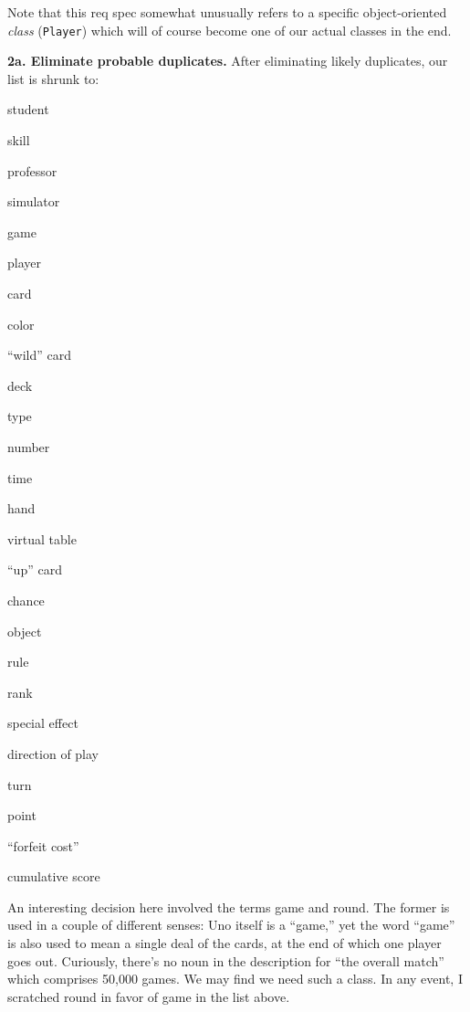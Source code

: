 Note that this req spec somewhat unusually refers to a specific
object-oriented \textit{class} (\texttt{Player}) which will of course become
one of our actual classes in the end.

\vspace{.1in}
\textbf{2a. Eliminate probable duplicates.} After eliminating likely
duplicates, our list is shrunk to:

\begin{samepage}
\begin{multicols}{3}
\small
\begin{compactitem}
\renewcommand\labelitemi{\raisebox{0.25ex}{\tiny$\bullet$}}
\item \textsf{student}
\item \textsf{skill}
\item \textsf{professor}
\item \textsf{simulator}
\item \textsf{game}
\item \textsf{player}
\item \textsf{card}
\item \textsf{color}
\item \textsf{``wild'' card}
\columnbreak
\item \textsf{deck}
\item \textsf{type}
\item \textsf{number}
\item \textsf{time}
\item \textsf{hand}
\item \textsf{virtual table}
\item \textsf{``up'' card}
\item \textsf{chance}
\item \textsf{object}
\columnbreak
\item \textsf{rule}
\item \textsf{rank}
\item \textsf{special effect}
\item \textsf{direction of play}
\item \textsf{turn}
\item \textsf{point}
\item \textsf{``forfeit cost''}
\item \textsf{cumulative score}
\end{compactitem}
\end{multicols}
\end{samepage}

An interesting decision here involved the terms \textsf{game} and
\textsf{round}. The former is used in a couple of different senses: Uno itself
is a ``game,'' yet the word ``game'' is also used to mean a single deal of the
cards, at the end of which one player goes out. Curiously, there's no noun in
the description for ``the overall match'' which comprises 50,000 games. We may
find we need such a class. In any event, I scratched \textsf{round} in favor
of \textsf{game} in the list above.

